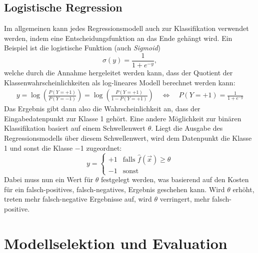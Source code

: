 	\section{Logistische Regression}
		\label{sec:logisticRegression}

		Im allgemeinen kann jedes Regressionsmodell auch zur Klassifikation verwendet werden, indem eine Entscheidungsfunktion an das Ende gehängt wird. Ein Beispiel ist die logistische Funktion (auch \emph{Sigmoid})
		\begin{equation}
			\sigma(y) = \frac{1}{1 + e^{-y}},
		\end{equation}
		welche durch die Annahme hergeleitet werden kann, dass der Quotient der Klassenwahrscheinlichkeiten als log-lineares Modell berechnet werden kann:
		\begin{gather}
			y = \log( \frac{P(Y = +1)}{P(Y = -1)} ) = \log( \frac{P(Y = +1)}{1 - P(Y = +1)} )
			\quad\iff\quad  P(Y = +1) = \frac{1}{1 + e^{-y}}
		\end{gather}
		Das Ergebnis gibt dann also die Wahrscheinlichkeit an, dass der Eingabedatenpunkt zur Klasse \num{1} gehört. Eine andere Möglichkeit zur binären Klassifikation basiert auf einem Schwellenwert \(\theta\). Liegt die Ausgabe des Regressionsmodells über diesem Schwellenwert, wird dem Datenpunkt die Klasse \num{+1} und sonst die Klasse \num{-1} zugeordnet:
		\begin{equation}
			y =
				\begin{cases}
					+1 & \text{falls } \hat{f}(\vec{x}) \geq \theta \\
					-1 & \text{sonst}
				\end{cases}
		\end{equation}
		Dabei muss nun ein Wert für \(\theta\) festgelegt werden, was \zB basierend auf den Kosten für ein falsch-positives, \bzw falsch-negatives, Ergebnis geschehen kann. Wird \(\theta\) erhöht, treten mehr falsch-negative Ergebnisse auf, wird \(\theta\) verringert, mehr falsch-positive.

\chapter{Modellselektion und Evaluation}
	\label{c:evaluation}


